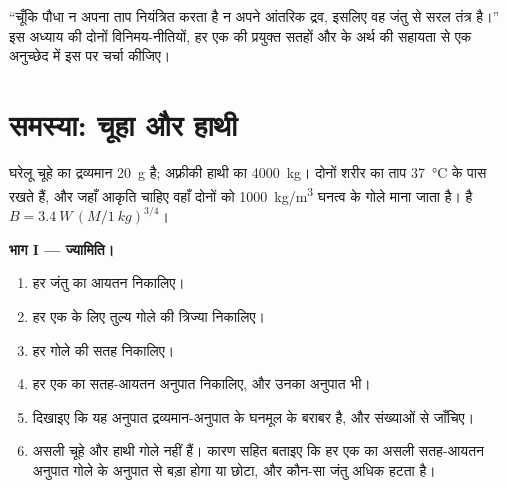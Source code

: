 \begin{exercise}[$\star\star\star$]\label{exo:b1:organism-environment:12}
``चूँकि पौधा न अपना ताप नियंत्रित करता है न अपने आंतरिक द्रव, इसलिए वह
जंतु से सरल तंत्र है।'' इस अध्याय की दोनों विनिमय-नीतियों, हर एक की
प्रयुक्त सतहों और  के अर्थ की सहायता से एक अनुच्छेद में इस पर
चर्चा कीजिए।
\end{exercise}

\section{समस्या: चूहा और हाथी}

\begin{problem}
\label{pb:b1:organism-environment:1}
घरेलू चूहे का द्रव्यमान \qty{20}{g} है; अफ़्रीकी हाथी का
\qty{4000}{kg}। दोनों शरीर का ताप \qty{37}{\celsius} के पास रखते हैं,
और जहाँ आकृति चाहिए वहाँ दोनों को \qty{1000}{kg/m^3} घनत्व के गोले माना
जाता है।  है $B = \qty{3.4}{W}\,(M/\qty{1}{kg})^{3/4}$।

\medskip
\noindent\textbf{भाग I --- ज्यामिति।}
\begin{enumerate}
  \item हर जंतु का आयतन निकालिए।
  \item हर एक के लिए तुल्य गोले की त्रिज्या निकालिए।
  \item हर गोले की सतह निकालिए।
  \item हर एक का सतह-आयतन अनुपात निकालिए, और उनका अनुपात भी।
  \item दिखाइए कि यह अनुपात द्रव्यमान-अनुपात के घनमूल के बराबर है, और
        संख्याओं से जाँचिए।
  \item असली चूहे और हाथी गोले नहीं हैं। कारण सहित बताइए कि हर एक का
        असली सतह-आयतन अनुपात गोले के अनुपात से बड़ा होगा या छोटा, और
        कौन-सा जंतु अधिक हटता है।
\end{enumerate}


\end{problem}
